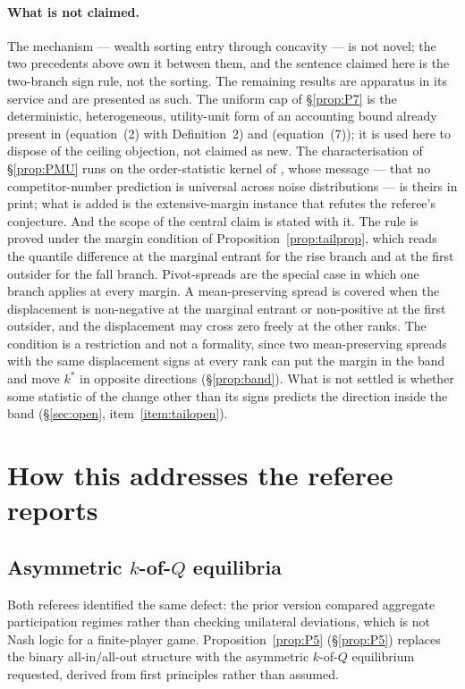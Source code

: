 \documentclass[11pt]{article}
\begin{document}
\paragraph{What is not claimed.} The mechanism --- wealth sorting entry
through concavity --- is not novel; the two precedents above own it between
them, and the sentence claimed here is the two-branch sign rule, not the
sorting. The remaining results are apparatus in its service and are
presented as such. The uniform cap of \S\ref{prop:P7} is the deterministic,
heterogeneous, utility-unit form of an accounting bound already present in
\citet{FuJiaoLu2015} (equation~(2) with Definition~2) and \citet{FuLu2010}
(equation~(7)); it is used here to dispose of the ceiling objection, not
claimed as new. The characterisation of \S\ref{prop:PMU} runs on the
order-statistic kernel of \citet{RyvkinDrugov2020}, whose message --- that no
competitor-number prediction is universal across noise distributions --- is
theirs in print; what is added is the extensive-margin instance that refutes
the referee's conjecture. And the scope of the central claim is stated with
it. The rule is proved under the margin condition of
Proposition~\ref{prop:tailprop}, which reads the quantile difference at the
marginal entrant for the rise branch and at the first outsider for the fall
branch. Pivot-spreads are the special case in which one branch applies at every
margin. A mean-preserving spread is covered when the displacement is
non-negative at the marginal entrant or non-positive at the first outsider, and
the displacement may cross zero freely at the other ranks. The condition is a
restriction and not a formality, since two mean-preserving spreads with the
same displacement signs at every rank can put the margin in the band and move
$k^*$ in opposite directions (\S\ref{prop:band}). What is not settled is
whether some statistic of the change other than its signs predicts the
direction inside the band (\S\ref{sec:open}, item~\ref{item:tailopen}).

\section{How this addresses the referee reports}

\subsection{Asymmetric \texorpdfstring{$k$}{k}-of-\texorpdfstring{$Q$}{Q} equilibria}
\label{sec:R1-asymmetric}
Both referees identified the same defect: the prior version compared
aggregate participation regimes rather than checking unilateral
deviations, which is not Nash logic for a finite-player game.
Proposition~\ref{prop:P5} (\S\ref{prop:P5}) replaces the binary
all-in/all-out structure with the asymmetric $k$-of-$Q$ equilibrium
requested, derived from first principles rather than assumed.
\end{document}
